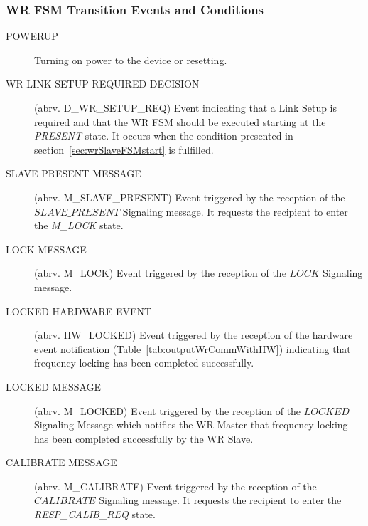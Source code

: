 \documentclass[a4paper, 12pt]{article}
\begin{document}
\subsubsection{WR FSM Transition Events and Conditions}
\label{sec:wrEventsAndConditions}
\begin{description}
\item[POWERUP]				Turning on power to the device or resetting.

\item[WR LINK SETUP REQUIRED DECISION] 	(abrv. D\_WR\_SETUP\_REQ) 	Event indicating that a 
      Link Setup is required and that the WR FSM should be executed starting at the
      \textit{PRESENT} state. It occurs when the condition presented in 
      section~\ref{sec:wrSlaveFSMstart} is fulfilled.

\item[SLAVE PRESENT MESSAGE] 		(abrv. M\_SLAVE\_PRESENT) 	Event triggered by the 
      reception of the $SLAVE\_PRESENT$ Signaling message. It requests the recipient to enter 
      the \textit{M\_LOCK} state.

\item[LOCK MESSAGE] 			(abrv. M\_LOCK) 		Event triggered by the 
      reception of the $LOCK$ Signaling message.

\item[LOCKED HARDWARE EVENT] 		(abrv. HW\_LOCKED) 		Event triggered by the 
      reception of the hardware event notification (Table~\ref{tab:outputWrCommWithHW}) indicating 
      that frequency locking has been completed successfully.

\item[LOCKED MESSAGE] 			(abrv. M\_LOCKED)		Event triggered by the 
      reception of the $LOCKED$ Signaling Message which notifies the WR Master that frequency 
      locking has been completed successfully by the WR Slave.

\item[CALIBRATE MESSAGE] 		(abrv. M\_CALIBRATE) 		Event triggered by the 
      reception of the $CALIBRATE$ Signaling message. It requests the recipient to enter the \\
      \textit{RESP\_CALIB\_REQ} state.



\end{description}
\end{document}
